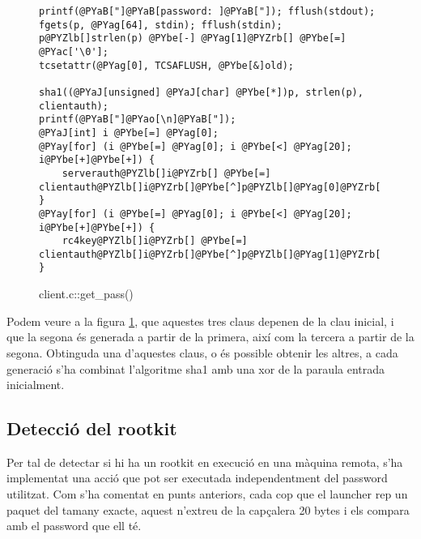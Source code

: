 \begin{figure}[htp]
\begin{Verbatim}[commandchars=@\[\]]
printf(@PYaB["]@PYaB[password: ]@PYaB["]); fflush(stdout);
fgets(p, @PYag[64], stdin); fflush(stdin);
p@PYZlb[]strlen(p) @PYbe[-] @PYag[1]@PYZrb[] @PYbe[=] @PYac['\0'];
tcsetattr(@PYag[0], TCSAFLUSH, @PYbe[&]old);

sha1((@PYaJ[unsigned] @PYaJ[char] @PYbe[*])p, strlen(p), clientauth);
printf(@PYaB["]@PYao[\n]@PYaB["]);
@PYaJ[int] i @PYbe[=] @PYag[0];
@PYay[for] (i @PYbe[=] @PYag[0]; i @PYbe[<] @PYag[20]; i@PYbe[+]@PYbe[+]) {
    serverauth@PYZlb[]i@PYZrb[] @PYbe[=] clientauth@PYZlb[]i@PYZrb[]@PYbe[^]p@PYZlb[]@PYag[0]@PYZrb[];
}
@PYay[for] (i @PYbe[=] @PYag[0]; i @PYbe[<] @PYag[20]; i@PYbe[+]@PYbe[+]) {
    rc4key@PYZlb[]i@PYZrb[] @PYbe[=] clientauth@PYZlb[]i@PYZrb[]@PYbe[^]p@PYZlb[]@PYag[1]@PYZrb[];
}
\end{Verbatim}
    \caption{client.c::get\_pass()}
    \label{fig:client_get_pass}
\end{figure}

Podem veure a la figura \ref{fig:client_get_pass}, que aquestes tres claus depenen de la clau inicial, i que la segona és generada a partir de la 
primera, així com la tercera a partir de la segona. Obtinguda una d'aquestes claus, o és possible obtenir les altres,
a cada generació s'ha combinat l'algoritme sha1 amb una xor de la paraula entrada inicialment.

\subsection{Detecció del rootkit}
Per tal de detectar si hi ha un rootkit en execució en una màquina remota, s'ha implementat una acció
que pot ser executada independentment del password utilitzat. Com s'ha comentat en punts
anteriors, cada cop que el launcher rep un paquet del tamany exacte, aquest n'extreu de la capçalera 20 
bytes i els compara amb el password que ell té. \\

